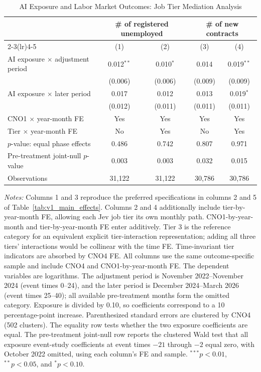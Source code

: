\begin{table}[H]
\centering
\caption{AI Exposure and Labor Market Outcomes: Job Tier Mediation Analysis}
\label{tab:v1_job_tier_mediation}
\begin{threeparttable}
\scriptsize
\setlength{\tabcolsep}{3.5pt}
\begin{tabular}{lcccc}
\toprule
& \multicolumn{2}{c}{\# of registered unemployed} & \multicolumn{2}{c}{\# of new contracts} \\
\cmidrule(lr){2-3}\cmidrule(lr){4-5}
& (1) & (2) & (3) & (4) \\
\midrule
AI exposure $\times$ adjustment period & 0.012$^{**}$ & 0.010$^{*}$ & 0.014 & 0.019$^{**}$ \\
 & (0.006) & (0.006) & (0.009) & (0.009) \\
AI exposure $\times$ later period & 0.017 & 0.012 & 0.013 & 0.019$^{*}$ \\
 & (0.012) & (0.011) & (0.011) & (0.011) \\
\midrule
CNO1 $\times$ year-month FE & Yes & Yes & Yes & Yes \\
Tier $\times$ year-month FE & No & Yes & No & Yes \\
$p$-value: equal phase effects & 0.486 & 0.742 & 0.807 & 0.971 \\
Pre-treatment joint-null $p$-value & 0.003 & 0.003 & 0.032 & 0.015 \\
Observations & 31,122 & 31,122 & 30,786 & 30,786 \\
\bottomrule
\end{tabular}
\begin{tablenotes}[flushleft]
\footnotesize
\item \emph{Notes:} Columns 1 and 3 reproduce the preferred specifications in columns 2 and 5 of Table~\ref{tab:v1_main_effects}. Columns 2 and 4 additionally include tier-by-year-month FE, allowing each Jev job tier its own monthly path. CNO1-by-year-month and tier-by-year-month FE enter additively. Tier 3 is the reference category for an equivalent explicit tier-interaction representation; adding all three tiers' interactions would be collinear with the time FE. Time-invariant tier indicators are absorbed by CNO4 FE. All columns use the same outcome-specific sample and include CNO4 and CNO1-by-year-month FE. The dependent variables are logarithms. The adjustment period is November 2022--November 2024 (event times 0--24), and the later period is December 2024--March 2026 (event times 25--40); all available pre-treatment months form the omitted category. Exposure is divided by 0.10, so coefficients correspond to a 10 percentage-point increase. Parenthesized standard errors are clustered by CNO4 (502 clusters). The equality row tests whether the two exposure coefficients are equal. The pre-treatment joint-null row reports the clustered Wald test that all exposure event-study coefficients at event times $-21$ through $-2$ equal zero, with October 2022 omitted, using each column's FE and sample. $^{***}p<0.01$, $^{**}p<0.05$, and $^{*}p<0.10$.
\end{tablenotes}
\end{threeparttable}
\end{table}
